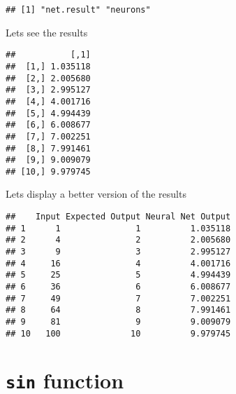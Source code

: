 \documentclass[]{article}
\newenvironment{Shaded}{\begin{snugshade}}{\end{snugshade}}
\newcommand{\KeywordTok}[1]{\textcolor[rgb]{0.13,0.29,0.53}{\textbf{#1}}}
\newcommand{\NormalTok}[1]{#1}
\newcommand{\OperatorTok}[1]{\textcolor[rgb]{0.81,0.36,0.00}{\textbf{#1}}}
\newcommand{\StringTok}[1]{\textcolor[rgb]{0.31,0.60,0.02}{#1}}
\begin{document}
\begin{verbatim}
## [1] "net.result" "neurons"
\end{verbatim}

Lets see the results

\begin{Shaded}
\end{Shaded}

\begin{verbatim}
##           [,1]
##  [1,] 1.035118
##  [2,] 2.005680
##  [3,] 2.995127
##  [4,] 4.001716
##  [5,] 4.994439
##  [6,] 6.008677
##  [7,] 7.002251
##  [8,] 7.991461
##  [9,] 9.009079
## [10,] 9.979745
\end{verbatim}

Lets display a better version of the results

\begin{Shaded}
\end{Shaded}

\begin{verbatim}
##    Input Expected Output Neural Net Output
## 1      1               1          1.035118
## 2      4               2          2.005680
## 3      9               3          2.995127
## 4     16               4          4.001716
## 5     25               5          4.994439
## 6     36               6          6.008677
## 7     49               7          7.002251
## 8     64               8          7.991461
## 9     81               9          9.009079
## 10   100              10          9.979745
\end{verbatim}

\hypertarget{sin-function}{%
\section{\texorpdfstring{\texttt{sin}
function}{sin function}}\label{sin-function}}
\end{document}
